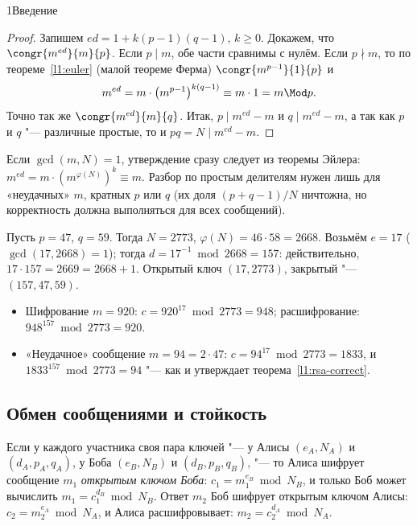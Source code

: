 \begin{lecture}{1}{Введение}
\begin{proof}
Запишем $ed = 1 + k(p - 1)(q - 1)$, $k \ge 0$. Докажем, что $\congr{m^{ed}}{m}{p}$.
Если $p \mid m$, обе части сравнимы с нулём. Если $p \nmid m$, то по теореме~\ref{l1:euler}
(малой теореме Ферма) $\congr{m^{p-1}}{1}{p}$ и
\[
  m^{ed} = m \cdot \bigl(m^{p-1}\bigr)^{k(q-1)} \equiv m \cdot 1 = m \Mod p.
\]
Точно так же $\congr{m^{ed}}{m}{q}$. Итак, $p \mid m^{ed} - m$ и $q \mid m^{ed} - m$, а так
как $p$ и $q$ "--- различные простые, то и $pq = N \mid m^{ed} - m$.
\end{proof}

\begin{remark}
Если $\gcd(m, N) = 1$, утверждение сразу следует из теоремы Эйлера:
$m^{ed} = m \cdot (m^{\varphi(N)})^k \equiv m$. Разбор по простым делителям нужен лишь для
«неудачных» $m$, кратных $p$ или $q$ (их доля $(p + q - 1)/N$ ничтожна, но корректность
должна выполняться для всех сообщений).
\end{remark}

\begin{example}\label{l1:rsa-example}
Пусть $p = 47$, $q = 59$. Тогда $N = 2773$, $\varphi(N) = 46 \cdot 58 = 2668$. Возьмём $e = 17$
($\gcd(17, 2668) = 1$); тогда $d = 17^{-1} \bmod 2668 = 157$: действительно,
$17 \cdot 157 = 2669 = 2668 + 1$. Открытый ключ $(17, 2773)$, закрытый "--- $(157, 47, 59)$.
\begin{itemize}
  \item Шифрование $m = 920$: $c = 920^{17} \bmod 2773 = 948$; расшифрование:
    $948^{157} \bmod 2773 = 920$.
  \item «Неудачное» сообщение $m = 94 = 2 \cdot 47$: $c = 94^{17} \bmod 2773 = 1833$, и
    $1833^{157} \bmod 2773 = 94$ "--- как и утверждает теорема~\ref{l1:rsa-correct}.
\end{itemize}
\end{example}

\subsection{Обмен сообщениями и стойкость}

Если у каждого участника своя пара ключей "--- у Алисы $(e_A, N_A)$ и $(d_A, p_A, q_A)$, у
Боба $(e_B, N_B)$ и $(d_B, p_B, q_B)$, "--- то Алиса шифрует сообщение $m_1$ \emph{открытым
ключом Боба}: $c_1 = m_1^{e_B} \bmod N_B$, и только Боб может вычислить
$m_1 = c_1^{d_B} \bmod N_B$. Ответ $m_2$ Боб шифрует открытым ключом Алисы:
$c_2 = m_2^{e_A} \bmod N_A$, и Алиса расшифровывает: $m_2 = c_2^{d_A} \bmod N_A$.


\end{lecture}

